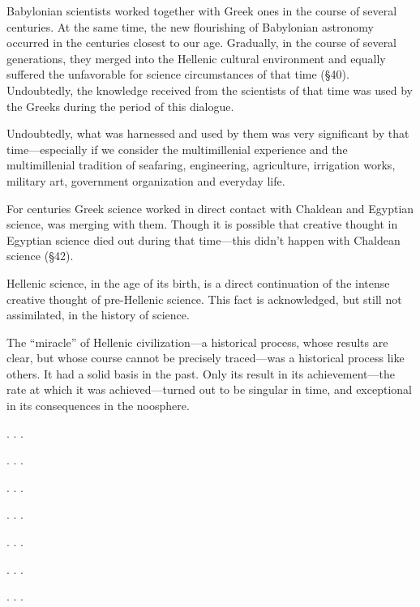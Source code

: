 Babylonian scientists worked together with Greek ones in the course of several
centuries.  At the same time, the new flourishing of Babylonian astronomy
occurred in the centuries closest to our age.  Gradually, in the course of
several generations, they merged into the Hellenic cultural environment and
equally suffered the unfavorable for science circumstances of that time (§40).
Undoubtedly, the knowledge received from the scientists of that time was used
by the Greeks during the period of this dialogue.

Undoubtedly, what was harnessed and used by them was very significant by that
time---especially if we consider the multimillenial experience and the
multimillenial tradition of seafaring, engineering, agriculture, irrigation
works, military art, government organization and everyday life.

For centuries Greek science worked in direct contact with Chaldean and Egyptian
science, was merging with them.  Though it is possible that creative thought in
Egyptian science died out during that time---this didn't happen with Chaldean
science (§42).

Hellenic science, in the age of its birth, is a direct continuation of the
intense creative thought of pre-Hellenic science.  This fact is acknowledged,
but still not assimilated, in the history of science.

The ``miracle'' of Hellenic civilization---a historical process, whose results
are clear, but whose course cannot be precisely traced---was a historical
process like others.  It had a solid basis in the past.  Only its result in its
achievement---the rate at which it was achieved---turned out to be singular in
time, and exceptional in its consequences in the noosphere.


\Section %

. . .

\Section %

. . .

\Section %

. . .

\Section %

. . .

\Section %

. . .

\Section %

. . .

\Section \label{sec:55} %

. . .
